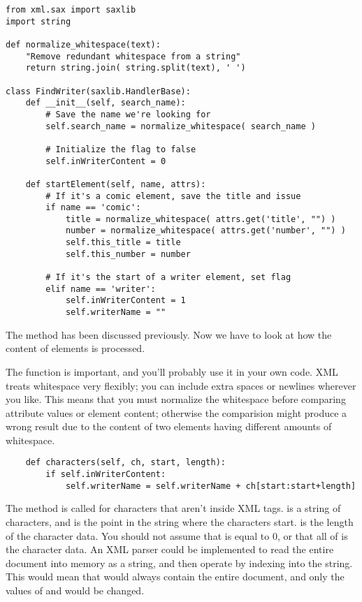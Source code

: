 \documentclass{howto}
\begin{document}
\begin{verbatim}
from xml.sax import saxlib
import string

def normalize_whitespace(text):
    "Remove redundant whitespace from a string"
    return string.join( string.split(text), ' ')

class FindWriter(saxlib.HandlerBase):
    def __init__(self, search_name):
        # Save the name we're looking for
        self.search_name = normalize_whitespace( search_name )

        # Initialize the flag to false
        self.inWriterContent = 0

    def startElement(self, name, attrs):
        # If it's a comic element, save the title and issue
        if name == 'comic':
            title = normalize_whitespace( attrs.get('title', "") )
            number = normalize_whitespace( attrs.get('number', "") )
            self.this_title = title
            self.this_number = number

        # If it's the start of a writer element, set flag
        elif name == 'writer':
            self.inWriterContent = 1
            self.writerName = ""
\end{verbatim}

The  method has been discussed previously.  Now
we have to look at how the content of elements is processed.  

The  function is important, and
you'll probably use it in your own code.  XML treats whitespace very
flexibly; you can include extra spaces or newlines wherever you like.
This means that you must normalize the whitespace before comparing
attribute values or element content; otherwise the comparision might
produce a wrong result due to the content of two elements having
different amounts of whitespace.

\begin{verbatim}
    def characters(self, ch, start, length):
        if self.inWriterContent:
            self.writerName = self.writerName + ch[start:start+length]
\end{verbatim}

The  method is called for characters that aren't
inside XML tags.   is a string of characters, and 
is the point in the string where the characters
start.   is the length of the character data.  You should
not assume that  is equal to 0, or that all of  is
the character data.  An XML parser could be implemented to read the
entire document into memory as a string, and then operate by indexing
into the string.   This would mean that  would always contain
the entire document, and only the values of  and
 would be changed.  
\end{document}
